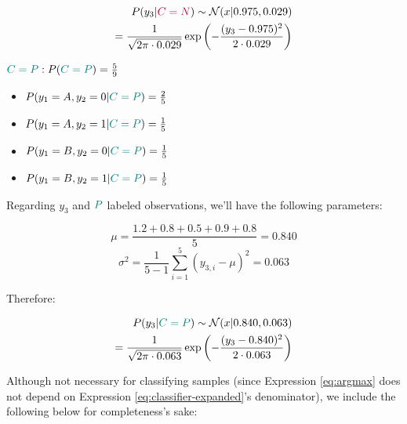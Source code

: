 \documentclass[12pt]{article}
\begin{document}
\begin{enumerate}[leftmargin=\labelsep]
\begin{multicols}{2}
          \vspace{-1cm}

          \begin{align*}
            P(y_3 | \textcolor{purple}{C = N}) \sim \mathcal{N}(x | 0.975, 0.029) \\
            = \frac{1}{\sqrt{2 \pi \cdot 0.029}} \exp \left( - \frac{(y_3 - 0.975)^2}{2 \cdot 0.029} \right)
          \end{align*}

          \columnbreak
          $\textcolor{teal}{C = P}: P(\textcolor{teal}{C = P}) = \frac{5}{9}$
          \begin{itemize}
            \item $P(y_1 = A, y_2 = 0 | \textcolor{teal}{C = P}) = \frac{2}{5}$
            \item $P(y_1 = A, y_2 = 1 | \textcolor{teal}{C = P}) = \frac{1}{5}$
            \item $P(y_1 = B, y_2 = 0 | \textcolor{teal}{C = P}) = \frac{1}{5}$
            \item $P(y_1 = B, y_2 = 1 | \textcolor{teal}{C = P}) = \frac{1}{5}$
          \end{itemize}
          Regarding $y_3$ and $\textcolor{teal}{P}$ labeled observations, we'll have the following parameters:

          \vspace{-0.6cm}

          $$
            \mu = \frac{1.2 + 0.8 + 0.5 + 0.9 + 0.8}{5} = 0.840
          $$
          $$
            \sigma^2 = \frac{1}{5 - 1} \sum_{i = 1}^5 (y_{3, i} - \mu)^2 = 0.063
          $$

          Therefore:

          \vspace{-1cm}

          \begin{align*}
            P(y_3 | \textcolor{teal}{C = P}) \sim \mathcal{N}(x | 0.840, 0.063) \\
            = \frac{1}{\sqrt{2 \pi \cdot 0.063}} \exp \left( - \frac{(y_3 - 0.840)^2}{2 \cdot 0.063} \right)
          \end{align*}

        \end{multicols}

        Although not necessary for classifying samples (since Expression \ref{eq:argmax} does not
        depend on Expression \ref{eq:classifier-expanded}'s denominator), we include the following
        below for completeness's sake:


\end{enumerate}
\end{document}

